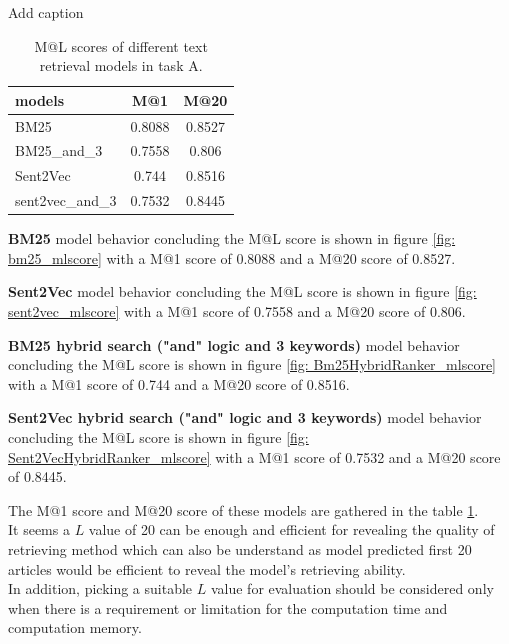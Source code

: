 \begin{table}[htbp]
	\centering
	\caption{Add caption}
	\begin{tabular}{lcc}
		\toprule
		models & M@1   & M@20 \\
		\midrule
		BM25  & 0.8088 & 0.8527 \\
		BM25\_and\_3 & 0.7558 & 0.806 \\
		Sent2Vec & 0.744 & 0.8516 \\
		sent2vec\_and\_3 & 0.7532 & 0.8445 \\
		\bottomrule
	\end{tabular}%
	\caption{M@L scores of different text retrieval models in task A.}
	\label{tab: models_ml_scores}%
\end{table}%


\textbf{BM25} 
model behavior concluding the M@L score is shown in figure \ref{fig: bm25_mlscore} with a M@1 score of 0.8088 and a M@20 score of 0.8527.

\textbf{Sent2Vec} 
model behavior concluding the M@L score is shown in figure \ref{fig: sent2vec_mlscore} with a M@1 score of 0.7558 and a M@20 score of 0.806.

\textbf{BM25 hybrid search ("and" logic and 3 keywords)} 
model behavior concluding the M@L score is shown in figure \ref{fig: Bm25HybridRanker_mlscore} with a M@1 score of 0.744 and a M@20 score of 0.8516.

\textbf{Sent2Vec hybrid search ("and" logic and 3 keywords)} 
model behavior concluding the M@L score is shown in figure \ref{fig: Sent2VecHybridRanker_mlscore} with a M@1 score of 0.7532 and a M@20 score of 0.8445.

The M@1 score and M@20 score of these models are gathered in the table \ref{tab: models_ml_scores}.\\


It seems a $L$ value of 20 can be enough and efficient for revealing the quality of retrieving method which can also be understand as model predicted first 20 articles would be efficient to reveal the model's retrieving ability.\\

In addition, picking a suitable $L$ value for evaluation should be considered only when there is a requirement or limitation for the computation time and computation memory. \\

